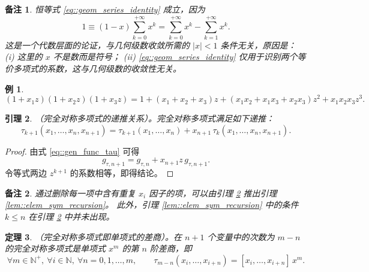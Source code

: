 \documentclass[a4paper]{ctexart}
\newtheorem{theorem}{定理}
\newtheorem{remark}{备注}
\newtheorem{lemma}[theorem]{引理}
\newtheorem{example}[theorem]{例}
\numberwithin{theorem}{section}
\numberwithin{equation}{section}
\numberwithin{figure}{section}
\numberwithin{remark}{section}
\begin{document}
\begin{remark}
    \label{rem::geom_series_algebraic}
恒等式 \eqref{eq::geom_series_identity} 成立，因为
\[
1\equiv (1-x)\sum_{k=0}^{+\infty}x^k
=\sum_{k=0}^{+\infty}x^k-\sum_{k=1}^{+\infty}x^k.
\]
这是一个代数层面的论证，与几何级数收敛所需的 $|x|<1$ 条件无关，原因是：
(i) 这里的 $x$ 不是数而是符号；
(ii) \eqref{eq::geom_series_identity} 仅用于识别两个等价多项式的系数，这与几何级数的收敛性无关。
\end{remark}

\begin{example}
    \label{ex::gen_example_344}
\[
(1+x_1 z)(1+x_2 z)(1+x_3 z)
=1+(x_1+x_2+x_3)z+(x_1x_2+x_1x_3+x_2x_3)z^2+x_1x_2x_3 z^3.
\]
\end{example}

\begin{lemma}
    \label{lem::tau_recursion}
（完全对称多项式的递推关系）。完全对称多项式满足如下递推：
\begin{equation}
\label{eq::tau_recursion}
\tau_{k+1}(x_1,\ldots,x_n,x_{n+1})
=\tau_{k+1}(x_1,\ldots,x_n)+x_{n+1}\,\tau_k(x_1,\ldots,x_n,x_{n+1}).
\end{equation}
\end{lemma}

\begin{proof}
由式 \eqref{eq::gen_func_tau} 可得
\begin{equation}
\label{eq::gen_tau_shift}
g_{\tau,n+1}=g_{\tau,n}+x_{n+1}z\,g_{\tau,n+1}.
\end{equation}
令等式两边 $z^{k+1}$ 的系数相等，即得结论。
\end{proof}

\begin{remark}
    \label{rem::deduce_sigma_from_tau}
通过删除每一项中含有重复 $x_i$ 因子的项，可以由引理 \ref{lem::tau_recursion} 推出引理 \ref{lem::elem_sym_recursion}。
此外，引理 \ref{lem::elem_sym_recursion} 中的条件 $k\le n$ 在引理 \ref{lem::tau_recursion} 中并未出现。
\end{remark}

\begin{theorem}
    \label{thm::tau_as_divdiff}
（完全对称多项式即单项式的差商）。在 $n+1$ 个变量中的次数为 $m-n$ 的完全对称多项式是单项式 $x^{m}$ 的第 $n$ 阶差商，即
\begin{equation}
\label{eq::tau_divdiff}
\forall m\in\mathbb{N}^+,\ \forall i\in\mathbb{N},\ \forall n=0,1,\ldots,m,\qquad
\tau_{m-n}(x_i,\ldots,x_{i+n})=[x_i,\ldots,x_{i+n}]\,x^{m}.
\end{equation}
\end{theorem}
\end{document}
